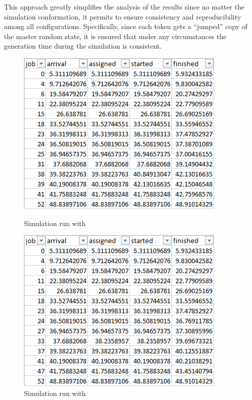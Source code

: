 This approach greatly simplifies the analysis of the results since no matter the simulation conformation, it permits to ensure consistency and reproducibility among all configurations. Specifically, since each token gets a ``jumped'' copy of the master random state, it is ensured that under any circumstances the generation time during the simulation is consistent.

\begin{figure}[!ht]
    \centering
    \begin{minipage}[b]{0.45\textwidth}
        \includegraphics[width=\textwidth]{img/pcg_msa}
        \caption{Simulation run with }
        \label{fig:pcg_msa}
    \end{minipage}
    \hfill
    \begin{minipage}[b]{0.45\textwidth}
        \includegraphics[width=\textwidth]{img/pcg_st}
        \caption{Simulation run with }
        \label{fig:pcg_st}
    \end{minipage}
\end{figure}

